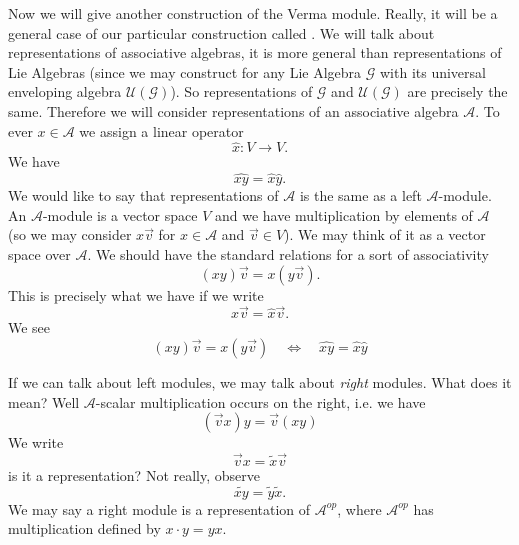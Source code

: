 Now we will give another construction of the Verma
module. Really, it will be a general case of our particular
construction called . We will
talk about representations of associative algebras, it is more
general than representations of Lie Algebras (since we may
construct for any Lie Algebra $\mathscr{G}$ with its universal
enveloping algebra $\mathcal{U}(\mathscr{G})$\thinspace). So
representations of $\mathscr{G}$ and $\mathcal{U}(\mathscr{G})$
are precisely the same. Therefore we will consider
representations of an associative algebra $\mathscr{A}$. To ever
$x\in\mathscr{A}$ we assign a linear operator
\begin{equation}
\widehat{x}\colon V\to V.
\end{equation}
We have
\begin{equation}
\widehat{xy}=\widehat{x}\widehat{y}.
\end{equation}
We would like to say that representations of $\mathscr{A}$ is the
same as a left $\mathscr{A}$-module. An $\mathscr{A}$-module is a
vector space $V$ and we have multiplication by elements of
$\mathscr{A}$ (so we may consider $x\vec{v}$ for
$x\in\mathscr{A}$ and $\vec{v}\in V$). We may think of it as a
vector space over $\mathscr{A}$. We should have the standard
relations for a sort of associativity
\begin{equation}
(xy)\vec{v}=x(y\vec{v}).
\end{equation}
This is precisely what we have if we write
\begin{equation}
x\vec{v}=\widehat{x}\vec{v}.
\end{equation}
We see
\begin{equation}
(xy)\vec{v}=x(y\vec{v})\quad\iff\quad\widehat{xy}=\widehat{x}\widehat{y}
\end{equation}

If we can talk about left modules, we may talk about \emph{right}
modules. What does it mean? Well $\mathscr{A}$-scalar
multiplication occurs on the right, i.e. we have
\begin{equation}
(\vec{v}x)y=\vec{v}(xy)
\end{equation}
We write
\begin{equation}
\vec{v}x=\widetilde{x}\vec{v}
\end{equation}
is it a representation? Not really, observe
\begin{equation}
\widetilde{xy}=\widetilde{y}\widetilde{x}.
\end{equation}
We may say a right module is a representation of
$\mathscr{A}^{op}$, where $\mathscr{A}^{op}$ has multiplication
defined by $x\cdot y=yx$.

